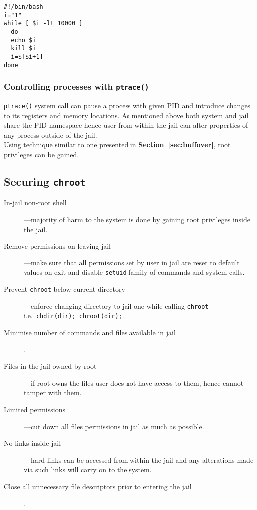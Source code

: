 \documentclass[12pt, a4paper, pdflatex]{article}
\begin{document}
\vspace{1em}
\lstset{
  captionpos=b,
  frame=single,
  language=bash,
  breaklines=true,
  caption=Kill processes outside of chroot jail.,
  label=chroot:kill,
  float=tb
}
\begin{lstlisting}
#!/bin/bash
i="1"
while [ $i -lt 10000 ]
  do
  echo $i
  kill $i
  i=$[$i+1]
done
\end{lstlisting}

\subsubsection{Controlling processes with \texttt{ptrace()}}
\texttt{ptrace()} system call can pause a process with given PID and introduce changes to its registers and memory locations. As mentioned above both system and jail share the PID namespace hence user from within the jail can alter properties of any process outside of the jail.\\
Using technique similar to one presented in \textbf{Section~\ref{sec:buffover}}, root privileges can be gained.

\subsection{Securing \texttt{chroot}}
\begin{description}
  \item[In-jail non-root shell]---majority of harm to the system is done by gaining root privileges inside the jail.
  \item[Remove permissions on leaving jail]---make sure that all permissions set by user in jail are reset to default values on exit and disable \texttt{setuid} family of commands and system calls.
  \item[Prevent \texttt{chroot} below current directory]---enforce changing directory to jail-one while calling \texttt{chroot} i.e.\ \texttt{chdir(dir); chroot(dir);}.
  \item[Minimise number of commands and files available in jail].
  \item[Files in the jail owned by root]---if root owns the files user does not have access to them, hence cannot tamper with them.
  \item[Limited permissions]---cut down all files permissions in jail as much as possible.
  \item[No links inside jail]---hard links can be accessed from within the jail and any alterations made via such links will carry on to the system.
  \item[Close all unnecessary file descriptors prior to entering the jail].
\end{description}
\end{document}
